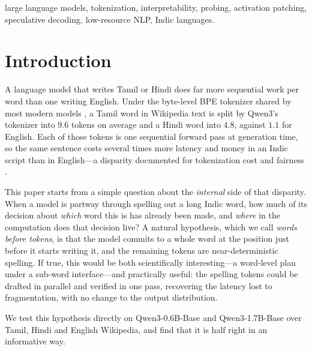 \begin{IEEEkeywords}
large language models, tokenization, interpretability, probing, activation
patching, speculative decoding, low-resource NLP, Indic languages.
\end{IEEEkeywords}

\section{Introduction}

A language model that writes Tamil or Hindi does far more sequential work per
word than one writing English. Under the byte-level BPE tokenizer shared by
most modern models \citep{radford2019gpt2,sennrich2016bpe}, a Tamil word in
Wikipedia text is split by Qwen3's tokenizer into $9.6$ tokens on average and a
Hindi word into $4.8$, against $1.1$ for English. Each of those tokens is one sequential forward pass at
generation time, so the same sentence costs several times more latency and
money in an Indic script than in English---a disparity documented for
tokenization cost and fairness \citep{petrov2023tokenizers,ahia2023costs}.

This paper starts from a simple question about the \emph{internal} side of that
disparity. When a model is partway through spelling out a long Indic word, how
much of its decision about \emph{which} word this is has already been made, and
\emph{where} in the computation does that decision live? A natural hypothesis,
which we call \emph{words before tokens}, is that the model commits to a whole
word at the position just before it starts writing it, and the remaining tokens
are near-deterministic spelling. If true, this would be both scientifically
interesting---a word-level plan under a sub-word interface---and practically
useful: the spelling tokens could be drafted in parallel and verified in one
pass, recovering the latency lost to fragmentation, with no change to the
output distribution.

We test this hypothesis directly on Qwen3-0.6B-Base and Qwen3-1.7B-Base
\citep{qwen3} over Tamil, Hindi and English Wikipedia, and find that it is
half right in an informative way.

